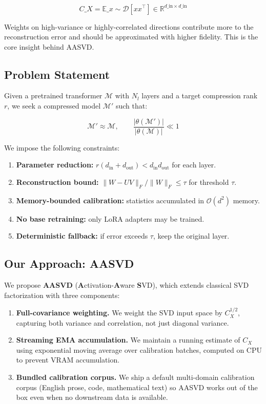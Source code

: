 \[
C\_X = \mathbb{E}\_{x \sim \mathcal{D}}\!\left[x x^\top\right] \in \mathbb{R}^{d\_\text{in} \times d\_\text{in}}
\tag{1.1}
\]

Weights on high-variance or highly-correlated directions contribute more 
to the reconstruction error and should be approximated with higher fidelity. 
This is the core insight behind AASVD.

\subsection{Problem Statement}

Given a pretrained transformer $\mathcal{M}$ with $N_l$ layers and a target 
compression rank $r$, we seek a compressed model $\mathcal{M}'$ such that:

\[
\mathcal{M}' \approx \mathcal{M}, \qquad
\frac{|\theta(\mathcal{M}')|}{|\theta(\mathcal{M})|} \ll 1
\tag{1.2}
\]

We impose the following constraints:

\begin{enumerate}
\item \textbf{Parameter reduction:} $r(d_\text{in} + d_\text{out}) < d_\text{in} d_\text{out}$ for each layer.
\item \textbf{Reconstruction bound:} $\|W - UV\|_F / \|W\|_F \leq \tau$ for threshold $\tau$.
\item \textbf{Memory-bounded calibration:} statistics accumulated in $\mathcal{O}(d^2)$ memory.
\item \textbf{No base retraining:} only LoRA adapters may be trained.
\item \textbf{Deterministic fallback:} if error exceeds $\tau$, keep the original layer.

\end{enumerate}
\subsection{Our Approach: AASVD}

We propose \textbf{AASVD} (\textbf{A}ctivation-\textbf{A}ware \textbf{S}VD), which extends classical 
SVD factorization with three components:

\begin{enumerate}
\item \textbf{Full-covariance weighting.} We weight the SVD input space by
  $C_X^{1/2}$, capturing both variance and correlation, not just diagonal
  variance.

\item \textbf{Streaming EMA accumulation.} We maintain a running estimate of $C_X$
  using exponential moving average over calibration batches, computed
  on CPU to prevent VRAM accumulation.

\item \textbf{Bundled calibration corpus.} We ship a default multi-domain calibration
  corpus (English prose, code, mathematical text) so AASVD works out of the
  box even when no downstream data is available.

\end{enumerate}
